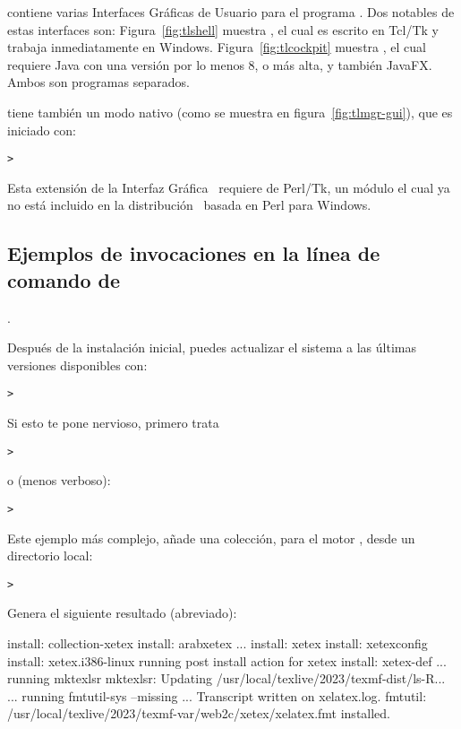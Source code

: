 \documentclass{article}
\begin{document}
\TL{} contiene varias Interfaces Gráficas de Usuario \GUI para el
programa . Dos notables de estas interfaces son:
Figura~\ref{fig:tlshell} muestra , el cual es escrito
en Tcl/Tk y trabaja inmediatamente en Windows.
Figura~\ref{fig:tlcockpit} muestra , el cual requiere
Java con una versión por lo menos 8, o más alta, y también JavaFX. Ambos
son programas separados.

 tiene también un modo nativo \GUI{}
(como se muestra en figura~\ref{fig:tlmgr-gui}), que es iniciado con:
\begin{alltt}
> 
\end{alltt}

Esta extensión de la Interfaz Gráfica \GUI\ requiere de
Perl/Tk, un módulo el cual ya no está incluido en la
distribución \TL\ basada en Perl para Windows.

\subsection{Ejemplos de invocaciones en la línea de comando de
}. 

Después de la instalación inicial, puedes actualizar el sistema a las
últimas versiones disponibles con: 
\begin{alltt}
> 
\end{alltt}
Si esto te pone nervioso, primero trata
\begin{alltt}
> 
\end{alltt}
o (menos verboso):
\begin{alltt}
> 
\end{alltt}

Este ejemplo más complejo, añade una colección, para el motor \XeTeX,
desde un directorio local:

\begin{alltt}
> 
\end{alltt}
Genera el siguiente resultado (abreviado):
\begin{fverbatim}
install: collection-xetex
install: arabxetex
...
install: xetex
install: xetexconfig
install: xetex.i386-linux
running post install action for xetex
install: xetex-def
...
running mktexlsr
mktexlsr: Updating /usr/local/texlive/2023/texmf-dist/ls-R...
...
running fmtutil-sys --missing
...
Transcript written on xelatex.log.
fmtutil: /usr/local/texlive/2023/texmf-var/web2c/xetex/xelatex.fmt installed.
\end{fverbatim}
\end{document}
